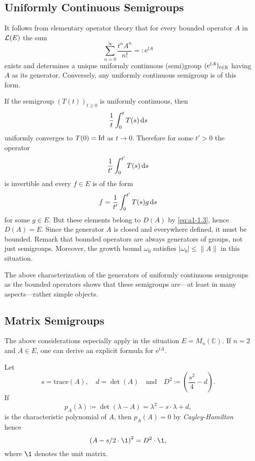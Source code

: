 \subsection{Uniformly Continuous Semigroups}\label{subsec:a1-2.1}%
It follows from elementary operator theory that for every bounded operator $A$ in  $\mathcal{L}(E)$ the sum
\[
    \sum_{n=0}^{\infty} \frac{t^{n}A^{n}}{n!} = \colon  \mathrm{e}^{tA}
\]
exists and determines a unique uniformly continuous (semi)group $( \mathrm{e}^{tA})_{t \in \mathbb{R}}$ having $A$ as its generator.
Conversely, any uniformly continuous semigroup is of this form.

If the semigroup $(T(t))_{t \geq 0}$ is uniformly continuous, then 
%
\[
	\frac{1}{t}\int_{0}^{t} T(s) \mathop{}\!\mathrm{d}{s}
\]
%
uniformly converges to $T(0) = \operatorname{Id}$ as $t \to 0$.
Therefore for some $t' > 0$ the operator 
%
\[
	\frac{1}{t'}\int_{0}^{t'} T(s) \mathop{}\!\mathrm{d}{s}
\]
%
is invertible and every $f \in E$ is of the form 
%
\[
	f = \frac{1}{t'}\int_{0}^{t'} T(s)g \mathop{}\!\mathrm{d}{s}
\]
%
for some $g \in E$.
But these elements belong to $D(A)$ by \eqref{eq:a1-1.3}, hence $D(A) = E$.
Since the generator $A$ is closed and everywhere defined, it must be bounded.
Remark that bounded operators are always generators of groups, not just semigroups.
Moreover, the growth bound $\omega_0$ satisfies $|\omega_0| \leq \|A\|$ in this situation.

The above characterization of the generators of uniformly continuous semigroups as the bounded operators shows that these semigroups are---at least in many aspects---rather simple objects.
\subsection{Matrix Semigroups}\label{subsec:a1-2.2}%
The above considerations especially apply in the situation $E = M_{n}(\mathbb{C})$.
If $n = 2$ and $A \in E$, one can derive an explicit formula for $ \mathrm{e}^{tA}$. 

Let %
\[
	s = \text{trace}(A), 
	\quad 
	d = \det(A) 
	\quad \text{and} \quad
	D^{2} \coloneqq \left( \frac{s^{2}}{4} - d \right).
\]
%
If   
\[
p_A(\lambda) \coloneqq \det(\lambda - A) = \lambda^2-s\cdot \lambda + d , 
\]
is the characteristic polynomial  of $ A $, then $ p_{A}(A) = 0 $ by \emph{Cayley-Hamilton} hence
%
\[
	\left( A - s/2 \cdot \1 \right)^{2} = D^{2} \cdot \1 , 
\]
%
where $ \1 $ denotes the unit matrix.

